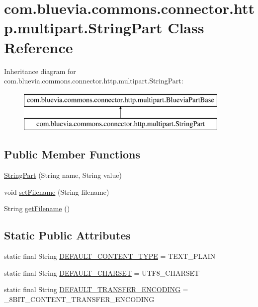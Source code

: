 \hypertarget{classcom_1_1bluevia_1_1commons_1_1connector_1_1http_1_1multipart_1_1StringPart}{
\section{com.bluevia.commons.connector.http.multipart.StringPart Class Reference}
\label{classcom_1_1bluevia_1_1commons_1_1connector_1_1http_1_1multipart_1_1StringPart}
}
Inheritance diagram for com.bluevia.commons.connector.http.multipart.StringPart:\begin{figure}[H]
\begin{center}
\leavevmode
\includegraphics[height=2.000000cm]{classcom_1_1bluevia_1_1commons_1_1connector_1_1http_1_1multipart_1_1StringPart}
\end{center}
\end{figure}
\subsection*{Public Member Functions}
\begin{DoxyCompactItemize}
\item 
\hyperlink{classcom_1_1bluevia_1_1commons_1_1connector_1_1http_1_1multipart_1_1StringPart_afbbba3250cd6017270c7891017f2d918}{StringPart} (String name, String value)
\item 
void \hyperlink{classcom_1_1bluevia_1_1commons_1_1connector_1_1http_1_1multipart_1_1StringPart_a75f594f5a698474a83f945c189d35bc9}{setFilename} (String filename)
\item 
String \hyperlink{classcom_1_1bluevia_1_1commons_1_1connector_1_1http_1_1multipart_1_1StringPart_abea015ba8c5e272b143b0314071b998f}{getFilename} ()
\end{DoxyCompactItemize}
\subsection*{Static Public Attributes}
\begin{DoxyCompactItemize}
\item 
static final String \hyperlink{classcom_1_1bluevia_1_1commons_1_1connector_1_1http_1_1multipart_1_1StringPart_a8b6049a4dbe20fbc395328e4a7682407}{DEFAULT\_\-CONTENT\_\-TYPE} = TEXT\_\-PLAIN
\item 
static final String \hyperlink{classcom_1_1bluevia_1_1commons_1_1connector_1_1http_1_1multipart_1_1StringPart_aa64e5f2887780dfa70466cffc3511603}{DEFAULT\_\-CHARSET} = UTF8\_\-CHARSET
\item 
static final String \hyperlink{classcom_1_1bluevia_1_1commons_1_1connector_1_1http_1_1multipart_1_1StringPart_a02fd67cc9c716ff16f09275b087205c3}{DEFAULT\_\-TRANSFER\_\-ENCODING} = \_\-8BIT\_\-CONTENT\_\-TRANSFER\_\-ENCODING
\end{DoxyCompactItemize}
